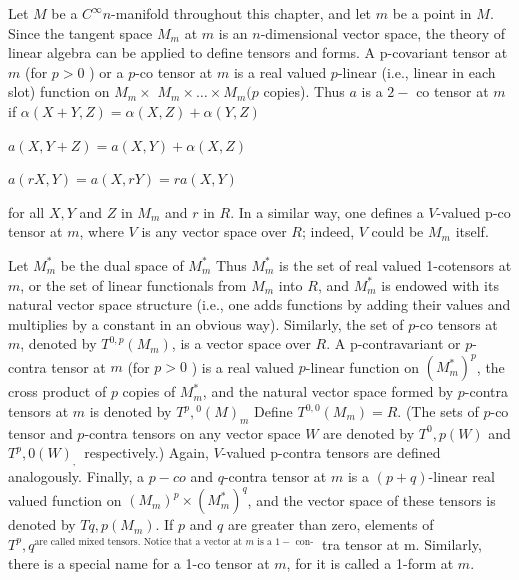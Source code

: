 \documentclass[10pt]{article}
\begin{document}
Let $M$ be a $C^{\infty} n$-manifold throughout this chapter, and let $m$ be a point in $M$. Since the tangent space $M_{m}$ at $m$ is an $n$-dimensional vector space, the theory of linear algebra can be applied to define tensors and forms. A p-covariant tensor at $m$ (for $p>0$ ) or a $p$-co tensor at $m$ is a real valued $p$-linear (i.e., linear in each slot) function on $M_{m} \times$ $M_{m} \times \ldots \times M_{m}(p$ copies). Thus $a$ is a $2-$ co tensor at $m$ if $\alpha(X+Y, Z)=\alpha(X, Z)+\alpha(Y, Z)$

$a(X, Y+Z)=a(X, Y)+\alpha(X, Z)$

$a(r X, Y)=a(X, r Y)=r a(X, Y)$

for all $X, Y$ and $Z$ in $M_{m}$ and $r$ in $R$. In a similar way, one defines a $V$-valued p-co tensor at $m$, where $V$ is any vector space over $R$; indeed, $V$ could be $M_{m}$ itself.

Let $M_{m}^{*}$ be the dual space of $M_{m}^{*}$ Thus $M_{m}^{*}$ is the set of real valued 1-cotensors at $m$, or the set of linear functionals from $M_{m}$ into $R$, and $M_{m}^{*}$ is endowed with its natural vector space structure (i.e., one adds functions by adding their values and multiplies by a constant in an obvious way). Similarly, the set of $p$-co tensors at $m$, denoted by $T^{0, p}\left(M_{m}\right)$, is a vector space over $R .$ A p-contravariant or $p$-contra tensor at $m$ (for $p>0$ ) is a real valued $p$-linear function on $\left(M_{m}^{*}\right)^{p}$, the cross product of $p$ copies of $M_{m}^{*}$, and the natural vector space formed by $p$-contra tensors at $m$ is denoted by $T^{p},{ }^{0}(M)_{m}$ Define $T^{0,0}\left(M_{m}\right)=R$. (The sets of $p$-co tensor and $p$-contra tensors on any vector space $W$ are denoted by $T^{0}, p(W)$ and $T^{p}, 0(W)_{\text {, }}$ respectively.) Again, $V$-valued p-contra tensors are defined analogously. Finally, a $p-c o$ and $q$-contra tensor at $m$ is a $(p+q)$-linear real valued function on $\left(M_{m}\right)^{p} \times\left(M_{m}^{*}\right)^{q}$, and the vector space of these tensors is denoted by $T q, p\left(M_{m}\right)$. If $p$ and $q$ are greater than zero, elements of $T^{p}, q^{\text {are called mixed tensors. Notice that a vector at } m \text { is a } 1-\text { con- }}$ tra tensor at m. Similarly, there is a special name for a 1-co tensor at $m$, for it is called a 1-form at $m$.
\end{document}
